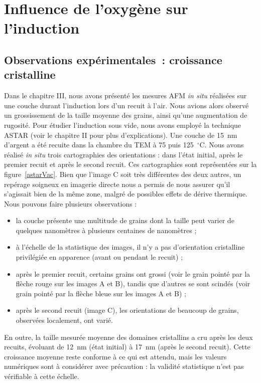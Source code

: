 \section{Influence de l'oxygène sur l'induction}

		\subsection{Observations expérimentales~: croissance cristalline}
Dans le chapitre III, nous avons présenté les mesures AFM \textit{in situ} réalisées sur une couche durant l'induction lors d'un recuit à l'air. Nous avions alors observé un grossissement de la taille moyenne des grains, ainsi qu'une augmentation de rugosité. Pour étudier l'induction sous vide, nous avons employé la technique ASTAR (voir le chapitre II pour plus d'explications). Une couche de 15~nm d'argent a été recuite dans la chambre du TEM à 75 puis 125~$^\circ$C. Nous avons réalisé \textit{in situ} trois cartographies des orientations : dans l'état initial, après le premier recuit et après le second recuit. Ces cartographies sont représentées sur la figure~\ref{astarVac}. Bien que l'image C soit très différentes des deux autres, un repérage soigneux en imagerie directe nous a permis de nous assurer qu'il s'agissait bien de la même zone, malgré de possibles effets de dérive thermique. Nous pouvons faire plusieurs observations :
\begin{itemize}
\item la couche présente une multitude de grains dont la taille peut varier de quelques nanomètres à plusieurs centaines de nanomètres ;
\item à l'échelle de la statistique des images, il n'y a pas d'orientation cristalline privilégiée en apparence (avant ou pendant le recuit) ;
\item après le premier recuit, certains grains ont grossi (voir le grain pointé par la flèche rouge sur les images A et B), tandis que d'autres se sont scindés (voir grain pointé par la flèche bleue sur les images A et B) ;
\item après le second recuit (image C), les orientations de beaucoup de grains, observées localement, ont varié.
\end{itemize}
En outre, la taille mesurée moyenne des domaines cristallins a cru après les deux recuits, évoluant de 12~nm (état initial) à 17~nm (après le second recuit). Cette croissance moyenne reste conforme à ce qui est attendu, mais les valeurs numériques sont à considérer avec précaution : la validité statistique n'est pas vérifiable à cette échelle.\par 
